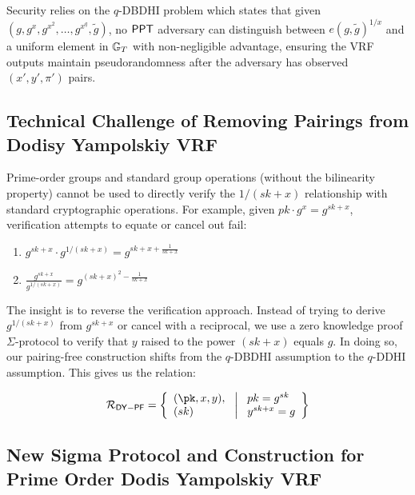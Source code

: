 Security relies on the $q$-DBDHI problem which states that given $(g, g^x, g^{x^2}, \ldots, g^{x^q}, \tilde{g})$, no $\mathsf{PPT}$ adversary can distinguish between $e(g,\tilde{g})^{1/x}$ and a uniform element in $\mathbb{G}_T$ with non-negligible advantage, ensuring the VRF outputs maintain pseudorandomness after the adversary has observed $(x',y',\pi')$ pairs.

\subsection{Technical Challenge of Removing Pairings from Dodisy Yampolskiy VRF}

Prime-order groups and standard group operations (without the bilinearity property) cannot be used to directly verify the $1/(sk+x)$ relationship with standard cryptographic operations. For example, given $pk  \cdot g^x = g^{sk+x}$, verification attempts to equate or cancel out fail:

\begin{enumerate}
    \item $g^{sk+x} \cdot g^{1/(sk+x)} = g^{sk + x + \frac{1}{sk+x}}$
    \item $\frac{g^{sk+x}}{g^{1/(sk+x)}} = g^{(sk+x)^2-\frac{1}{sk+x}}$
\end{enumerate}

The insight is to reverse the verification approach. Instead of trying to derive $g^{1/(sk+x)}$ from $g^{sk+x}$ or cancel with a reciprocal, we use a zero knowledge proof $\Sigma$-protocol to verify that $y$ raised to the power $(sk+x)$ equals $g$. In doing so, our pairing-free construction shifts from the $q$-DBDHI assumption to the $q$-DDHI assumption. This gives us the relation:

\[
\mathcal{R}_{\mathsf{DY-PF}} = \left\{ 
\begin{array}{l} 
(\pk, x, y),\\
(sk) 
\end{array}
\ \middle|
\ \begin{array}{l}
pk = g^{sk} \\
y^{sk + x} = g  \\
\end{array} \right\}
\]

\subsection{New Sigma Protocol and Construction for Prime Order Dodis Yampolskiy VRF}\label{sec-dy-pf}

